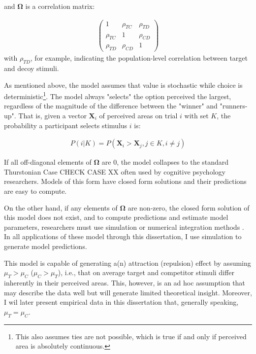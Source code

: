 and $\boldsymbol{\Omega}$ is a correlation matrix:

\begin{align}
   \begin{pmatrix}
      1 & \rho_{TC} & \rho_{TD} \\
      \rho_{TC} & 1 & \rho_{CD} \\
      \rho_{TD} & \rho_{CD} & 1 
   \end{pmatrix}
\label{eqn:O}
\end{align}
with $\rho_{TD}$, for example, indicating the population-level correlation between target and decoy stimuli.

As mentioned above, the model assumes that value is stochastic while choice is deterministic\footnote{This also assumes ties are not possible, which is true if and only if perceived area is absolutely continuous.}. The model always "selects" the option perceived the largest, regardless of the magnitude of the difference between the "winner" and "runners-up". That is, given a vector $\mathbf{X}_i$ of perceived areas on trial $i$ with set $K$, the probability a participant selects stimulus $i$ is:

\begin{align}
   P(i|K)=P(\mathbf{X}_{i}>\mathbf{X}_{j}, j \in K, i \neq j)
   \label{eqn:pchoice}
\end{align}

If all off-diagonal elements of $\boldsymbol{\Omega}$ are $0$, the model collapses to the standard Thurstonian Case CHECK CASE XX \parencite{thurstone1927law} often used by cognitive psychology researchers. Models of this form have closed form solutions and their predictions are easy to compute.

On the other hand, if any elements of $\boldsymbol{\Omega}$ are non-zero, the closed form solution of this model does not exist, and to compute predictions and estimate model parameters, researchers must use simulation or numerical integration methods \parencite{train2009discrete}. In all applications of these model through this dissertation, I use simulation to generate model predictions. 

This model is capable of generating a(n) attraction (repulsion) effect by assuming $\mu_{T}>\mu_{C}$ ($\mu_{C}>\mu_{T}$), i.e., that on average target and competitor stimuli differ inherently in their perceived areas. This, however, is an ad hoc assumption that may describe the data well but will generate limited theoretical insight. Moreover, I wil later present empirical data in this dissertation that, generally speaking, $\mu_{T}=\mu_{C}$. 

